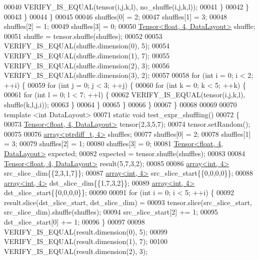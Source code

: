 \begin{DoxyCode}
00040           VERIFY\_IS\_EQUAL(tensor(i,j,k,l), no\_shuffle(i,j,k,l));
00041         \}
00042       \}
00043     \}
00044   \}
00045 
00046   shuffles[0] = 2;
00047   shuffles[1] = 3;
00048   shuffles[2] = 1;
00049   shuffles[3] = 0;
00050   \hyperlink{class_eigen_1_1_tensor}{Tensor<float, 4, DataLayout>} shuffle;
00051   shuffle = tensor.shuffle(shuffles);
00052 
00053   VERIFY\_IS\_EQUAL(shuffle.dimension(0), 5);
00054   VERIFY\_IS\_EQUAL(shuffle.dimension(1), 7);
00055   VERIFY\_IS\_EQUAL(shuffle.dimension(2), 3);
00056   VERIFY\_IS\_EQUAL(shuffle.dimension(3), 2);
00057 
00058   \textcolor{keywordflow}{for} (\textcolor{keywordtype}{int} i = 0; i < 2; ++i) \{
00059     \textcolor{keywordflow}{for} (\textcolor{keywordtype}{int} j = 0; j < 3; ++j) \{
00060       \textcolor{keywordflow}{for} (\textcolor{keywordtype}{int} k = 0; k < 5; ++k) \{
00061         \textcolor{keywordflow}{for} (\textcolor{keywordtype}{int} l = 0; l < 7; ++l) \{
00062           VERIFY\_IS\_EQUAL(tensor(i,j,k,l), shuffle(k,l,j,i));
00063         \}
00064       \}
00065     \}
00066   \}
00067 \}
00068 
00069 
00070 \textcolor{keyword}{template} <\textcolor{keywordtype}{int} DataLayout>
00071 \textcolor{keyword}{static} \textcolor{keywordtype}{void} test\_expr\_shuffling()
00072 \{
00073   \hyperlink{class_eigen_1_1_tensor}{Tensor<float, 4, DataLayout>} tensor(2,3,5,7);
00074   tensor.setRandom();
00075 
00076   \hyperlink{class_eigen_1_1array}{array<ptrdiff\_t, 4>} shuffles;
00077   shuffles[0] = 2;
00078   shuffles[1] = 3;
00079   shuffles[2] = 1;
00080   shuffles[3] = 0;
00081   \hyperlink{class_eigen_1_1_tensor}{Tensor<float, 4, DataLayout>} expected;
00082   expected = tensor.shuffle(shuffles);
00083 
00084   \hyperlink{class_eigen_1_1_tensor}{Tensor<float, 4, DataLayout>} result(5,7,3,2);
00085 
00086   \hyperlink{class_eigen_1_1array}{array<int, 4>} src\_slice\_dim\{\{2,3,1,7\}\};
00087   \hyperlink{class_eigen_1_1array}{array<int, 4>} src\_slice\_start\{\{0,0,0,0\}\};
00088   \hyperlink{class_eigen_1_1array}{array<int, 4>} dst\_slice\_dim\{\{1,7,3,2\}\};
00089   \hyperlink{class_eigen_1_1array}{array<int, 4>} dst\_slice\_start\{\{0,0,0,0\}\};
00090 
00091   \textcolor{keywordflow}{for} (\textcolor{keywordtype}{int} i = 0; i < 5; ++i) \{
00092     result.slice(dst\_slice\_start, dst\_slice\_dim) =
00093         tensor.slice(src\_slice\_start, src\_slice\_dim).shuffle(shuffles);
00094     src\_slice\_start[2] += 1;
00095     dst\_slice\_start[0] += 1;
00096   \}
00097 
00098   VERIFY\_IS\_EQUAL(result.dimension(0), 5);
00099   VERIFY\_IS\_EQUAL(result.dimension(1), 7);
00100   VERIFY\_IS\_EQUAL(result.dimension(2), 3);

\end{DoxyCode}

